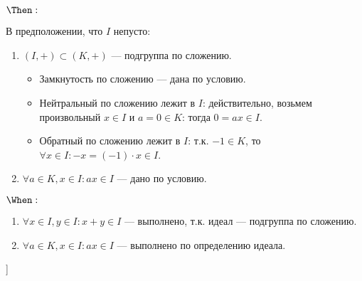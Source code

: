 \begin{solution}

\(\Then:\)

В предположении, что $I$ непусто:

\begin{enumerate}

\item $(I, +) \subset (K, +)$ --- подгруппа по сложению. 
	
	\begin{itemize}
	
	\item Замкнутость по сложению --- дана по условию.
	
	\item Нейтральный по сложению лежит в $I$: действительно, возьмем произвольный $x \in I$ и $a = 0 \in K$: тогда $0 = ax \in I$.
	
	\item Обратный по сложению лежит в $I$: т.к. $-1 \in K$, то $\forall x \in I: -x = (-1) \cdot x \in I$.
				
	\end{itemize}

\item $\forall a \in K, x \in I: ax \in I$ --- дано по условию.

\end{enumerate}

\(\When:\)

\begin{enumerate}
	
	\item $\forall x \in I, y \in I: x + y \in I$ --- выполнено, т.к. идеал --- подгруппа по сложению.
	
	\item $\forall a \in K, x \in I: ax \in I$ --- выполнено по определению идеала.
	
\end{enumerate}


\end{solution}



\begin{problem}[?? [Каргальцев]]
\end{problem}

